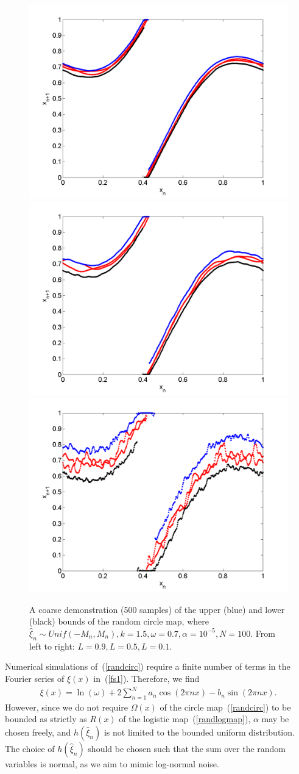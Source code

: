 \begin{figure}[htp]
\caption[Upper and lower bounds on the random circle map, with a uniform
distribution, where $k=1.5,\omega=0.7$]{A coarse
  demonstration (500 samples) of the upper (blue) and lower (black)
  bounds of the random circle map, where $\hat{\xi}_n\sim
  Unif(-M_n,M_n),k=1.5,\omega=0.7,\alpha = 10^{-5},N=100$. From left
  to right: $L=0.9,L=0.5,L=0.1$.}\label{fig:circ_u_envelope3}
\centering
\includegraphics[width=.3\textwidth]{figs/envelope_unif_500_k15_L09_w07.png}\hfill
\includegraphics[width=.3\textwidth]{figs/envelope_unif_500_k15_L05_w07.png}\hfill
\includegraphics[width=.3\textwidth]{figs/envelope_unif_500_k15_L01_w07.png}
\end{figure}

Numerical simulations of~(\ref{randcirc}) require a finite number of
terms in the Fourier series of $\xi(x)$ in~(\ref{fs1}). Therefore, we find
\begin{align}\label{fs_circ}
\xi(x) = \ln(\omega) + 2\sum^N_{n=1}a_n\cos(2\pi nx)-b_n\sin(2\pi nx).
\end{align}
However, since we
do not require $\Omega(x)$ of the circle map~(\ref{randcirc}) to be bounded as strictly
as $R(x)$ of the logistic map~(\ref{randlogmap}), $\alpha$ may be
chosen freely, and $h(\hat{\xi}_n)$ is not limited to the bounded uniform
distribution. The choice of $h(\hat{\xi}_n)$ should be chosen such that the
sum over the random variables is normal, as we aim to mimic log-normal
noise.

